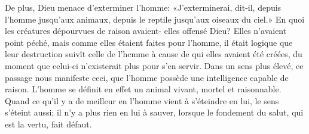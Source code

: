 De plus, Dieu menace d’exterminer l’homme:
	«J’exterminerai, dit-il, depuis l’homme jusqu’aux animaux,
	depuis le reptile jusqu’aux oiseaux du ciel.»
En quoi les créatures dépourvues de raison avaient- elles offensé Dieu?
	Elles n’avaient point péché, mais comme elles étaient faites pour l’homme,
	il était logique que leur destruction suivît celle de l’hcmme
	à cause de qui elles avaient été créées,
	du moment que celui-ci n’existerait plus pour s’en servir.
Dans un sens plus élevé, ce passage nous manifeste ceci,
	que l’homme possède une intelligence capable de raison.
L’homme se définit en effet un animal vivant, mortel et raisonnable.
Quand ce qu’il y a de meilleur en l’homme vient à s’éteindre en lui,
	le sens s’éteint aussi;
	il n’y a plus rien en lui à sauver,
	lorsque le fondement du salut, qui est la vertu, fait défaut.
